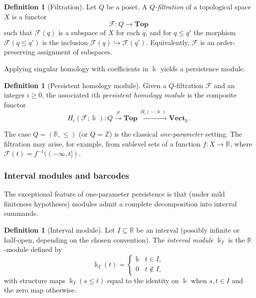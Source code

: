 \documentclass{article}
\newcommand{\kk}{\Bbbk}
\newcommand{\<}{\langle}
\renewcommand{\>}{\rangle}
\newcommand{\bbb}[1]{\ensuremath{\mathbb{#1}}}
\theoremstyle{definition}
\newtheorem{defn}[theorem]{Definition}
\theoremstyle{remark}
\begin{document}
	\begin{defn}[Filtration]\label{def:filtration}
		Let $Q$ be a poset.  A \emph{$Q$-filtration} of a topological space $X$ is a functor
		\[
		\mathcal{F}\colon Q\longrightarrow \mathbf{Top}
		\]
		such that $\mathcal{F}(q)$ is a subspace of $X$ for each $q$, and for $q\leq q'$ the
		morphism $\mathcal{F}(q\leq q')$ is the inclusion $\mathcal{F}(q)\hookrightarrow
		\mathcal{F}(q')$.  Equivalently, $\mathcal{F}$ is an order-preserving assignment of
		subspaces.
	\end{defn}
	
	Applying singular homology with coefficients in $\kk$ yields a persistence module.
	
	\begin{defn}[Persistent homology module]\label{def:persistent-homology-module}
		Given a $Q$-filtration $\mathcal{F}$ and an integer $i\geq 0$, the associated
		$i$th \emph{persistent homology module} is the composite functor
		\[
		H_i(\mathcal{F};\kk)\colon Q \xrightarrow{\ \mathcal{F}\ } \mathbf{Top}
		\xrightarrow{\ H_i(-;\kk)\ } \mathbf{Vect}_{\kk}.
		\]
	\end{defn}
	
	The case $Q=(\bbb{R},\leq)$ (or $Q=\bbb{Z}$) is the classical \emph{one-parameter}
	setting.  The filtration may arise, for example, from sublevel sets of a function
	$f\colon X\to \bbb{R}$, where $\mathcal{F}(t)=f^{-1}((-\infty,t])$.
	
	\subsubsection*{Interval modules and barcodes}
	
	
	The exceptional feature of one-parameter persistence is that (under mild finiteness
	hypotheses) modules admit a complete decomposition into interval summands.
	
	\begin{defn}[Interval module]\label{def:interval-module}
		Let $I\subseteq \bbb{R}$ be an interval (possibly infinite or half-open, depending on
		the chosen convention).  The \emph{interval module} $\kk_I$ is the $\bbb{R}$-module
		defined by
		\[
		\kk_I(t)=
		\begin{cases}
			\kk & t\in I,\\
			0 & t\notin I,
		\end{cases}
		\]
		with structure maps $\kk_I(s\leq t)$ equal to the identity on $\kk$ when $s,t\in I$
		and the zero map otherwise.
	\end{defn}
	
\end{document}
